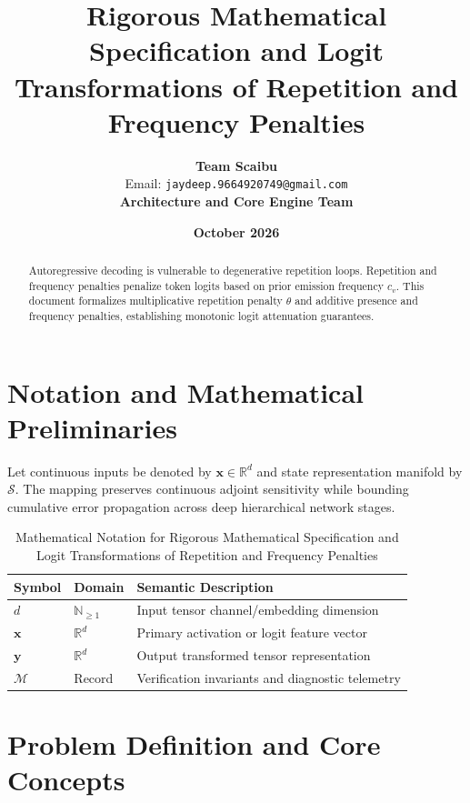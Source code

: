 \documentclass[11pt,a4paper]{article}
\title{\textbf{Rigorous Mathematical Specification and Logit Transformations of Repetition and Frequency Penalties}}
\author{\textbf{Team Scaibu} \\ \small Email: \texttt{jaydeep.9664920749@gmail.com} \\ \small \textbf{Architecture and Core Engine Team}}
\date{\textbf{October 2026}}
\theoremstyle{definition}
\begin{document}
\maketitle

\begin{abstract}
Autoregressive decoding is vulnerable to degenerative repetition loops. Repetition and frequency penalties penalize token logits based on prior emission frequency $c_v$. This document formalizes multiplicative repetition penalty $\theta$ and additive presence and frequency penalties, establishing monotonic logit attenuation guarantees.
\end{abstract}

\section{Notation and Mathematical Preliminaries}

Let continuous inputs be denoted by $\mathbf{x} \in \mathbb{R}^d$ and state representation manifold by $\mathcal{S}$. The mapping preserves continuous adjoint sensitivity while bounding cumulative error propagation across deep hierarchical network stages.

\begin{table}[h]
\centering
\caption{Mathematical Notation for Rigorous Mathematical Specification and Logit Transformations of Repetition and Frequency Penalties}
\begin{tabular}{lll}
\toprule
\textbf{Symbol} & \textbf{Domain} & \textbf{Semantic Description} \\
\midrule
$d$ & $\mathbb{N}_{\ge 1}$ & Input tensor channel/embedding dimension \\
$\mathbf{x}$ & $\mathbb{R}^d$ & Primary activation or logit feature vector \\
$\mathbf{y}$ & $\mathbb{R}^d$ & Output transformed tensor representation \\
$\mathcal{M}$ & Record & Verification invariants and diagnostic telemetry \\
\bottomrule
\end{tabular}
\end{table}

\section{Problem Definition and Core Concepts}
\end{document}

